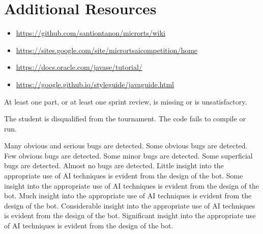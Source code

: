 \documentclass{../../fal_assignment}
\begin{document}
\section*{Additional Resources}

\begin{itemize}
	\item \url{https://github.com/santiontanon/microrts/wiki}
	\item \url{https://sites.google.com/site/micrortsaicompetition/home}
    \item \url{https://docs.oracle.com/javase/tutorial/}
    \item \url{https://google.github.io/styleguide/javaguide.html}
\end{itemize}

\rubricyeartwo
\begin{markingrubric}
		\grade\fail At least one part, or at least one sprint review, is missing or is unsatisfactory.
			\par The student is disqualified from the tournament.
%
        \grade \fail The code fails to compile or run.
            \par Many obvious and serious bugs are detected.
        \grade Some obvious bugs are detected.
        \grade Few obvious bugs  are detected.
        \grade Some minor bugs  are detected.
        \grade Some superficial bugs are detected.
        \grade Almost no bugs are detected.
%
        \grade \fail Little insight into the appropriate use of AI techniques is evident from the design of the bot.
        \grade Some insight into the appropriate use of AI techniques is evident from the design of the bot.
        \grade Much insight into the appropriate use of AI techniques is evident from the design of the bot.
        \grade Considerable insight into the appropriate use of AI techniques is evident from the design of the bot.
        \grade Significant insight into the appropriate use of AI techniques is evident from the design of the bot.

\end{markingrubric}
\end{document}
